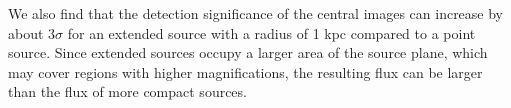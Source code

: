 \documentclass[chicago]{emulateapj}
\begin{document}
We also find that the detection significance of the central images can increase by about $3\sigma$ for an extended source with a radius of 1 kpc compared to a point source. Since extended sources occupy a larger area of the source plane, which may cover regions with higher magnifications, the resulting flux can be larger than the flux of more compact sources.
\end{document}
